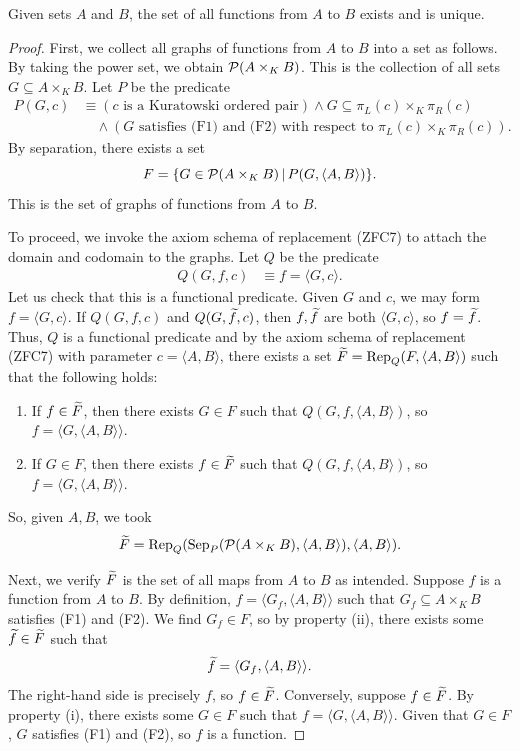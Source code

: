 \begin{prop}
	Given sets $A$ and $B$, the set of all functions from $A$ to $B$ exists and is unique. 
\end{prop}
\begin{proof}
	First, we collect all graphs of functions from $A$ to $B$ into a set as follows. 
	By taking the power set, we obtain $\mathcal{P}(A\times _{K} B)$. 
	This is the collection of all sets $G\subseteq A\times_{K} B$.
	Let $P$ be the predicate
	\begin{align*}
		P(G, c) &\equiv (c\text{ is a Kuratowski ordered pair})\land G\subseteq\pi_{L}(c)\times_{K} \pi_{R}(c) \\
		&\quad\land (G\text{ satisfies (F1) and (F2) with respect to }\pi_{L}(c)\times_{K} \pi_{R}(c)).
	\end{align*}
	By separation, there exists a set
	\[ F = \{ G\in\mathcal{P}(A\times_{K} B) \,|\, P(G, \langle A, B\rangle) \}. \]
	This is the set of graphs of functions from $A$ to $B$. 
	
	To proceed, we invoke the axiom schema of replacement (ZFC7) to attach the domain and codomain to the graphs. 
	Let $Q$ be the predicate
	\begin{align*}
		Q(G, f, c) &\equiv f = \langle G, c\rangle.
	\end{align*}
	Let us check that this is a functional predicate. 
	Given $G$ and $c$, we may form $f = \langle G, c\rangle$.
	If $Q(G, f, c)$ and $Q(G, \widetilde{f}, c)$, then $f, \widetilde{f}$ are both $\langle G, c\rangle$, so $f = \widetilde{f}$. 
	Thus, $Q$ is a functional predicate and by the axiom schema of replacement (ZFC7) with parameter $c = \langle A, B\rangle$, there exists a set $\widetilde{F} = \textrm{Rep}_{Q}(F, \langle A, B\rangle)$ such that the following holds:
	
	\begin{enumerate}[itemsep=-0.4ex, label=(\roman*)]
		\item If $f\in\widetilde{F}$, then there exists $G\in F$ such that $Q(G, f, \langle A, B\rangle)$, so $f = \langle G, \langle A, B\rangle\rangle$.
		\item If $G\in F$, then there exists $f\in\widetilde{F}$ such that $Q(G, f, \langle A, B\rangle)$, so $f = \langle G, \langle A, B\rangle\rangle$. 
	\end{enumerate}
	
	\noindent So, given $A, B$, we took 
	\[ \widetilde{F} = \textrm{Rep}_{Q}(\textrm{Sep}_{P}(\mathcal{P}(A\times_{K} B), \langle A, B\rangle), \langle A, B\rangle). \]
	
	Next, we verify $\widetilde{F}$ is the set of all maps from $A$ to $B$ as intended.
	Suppose $f$ is a function from $A$ to $B$. 
	By definition, $f = \langle G_{f}, \langle A, B\rangle\rangle$ such that $G_{f}\subseteq A\times_{K} B$ satisfies (F1) and (F2). 
	We find $G_{f}\in F$, so by property (ii), there exists some $\widetilde{f}\in\widetilde{F}$ such that 
	\[ \widetilde{f} = \langle G_{f}, \langle A, B\rangle\rangle. \]
	The right-hand side is precisely $f$, so $f\in\widetilde{F}$. 
	Conversely, suppose $f\in\widetilde{F}$. 
	By property (i), there exists some $G\in F$ such that $f = \langle G, \langle A, B\rangle\rangle$.
	Given that $G\in F$, $G$ satisfies (F1) and (F2), so $f$ is a function.
	

\end{proof}
